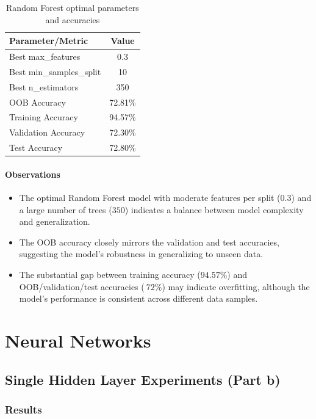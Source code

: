 \documentclass[12pt]{article}
\begin{document}
\begin{table}[h!]
\centering
\begin{tabular}{|l|c|}
\hline
\textbf{Parameter/Metric} & \textbf{Value} \\
\hline
Best max\_features & 0.3 \\
Best min\_samples\_split & 10 \\
Best n\_estimators & 350 \\
OOB Accuracy & 72.81\% \\
Training Accuracy & 94.57\% \\
Validation Accuracy & 72.30\% \\
Test Accuracy & 72.80\% \\
\hline
\end{tabular}
\caption{Random Forest optimal parameters and accuracies}
\label{tab:rf_results}
\end{table}

\paragraph{Observations}
\begin{itemize}
  \item The optimal Random Forest model with moderate features per split (\(0.3\)) and a large number of trees (\(350\)) indicates a balance between model complexity and generalization.
  \item The OOB accuracy closely mirrors the validation and test accuracies, suggesting the model's robustness in generalizing to unseen data.
  \item The substantial gap between training accuracy (\(94.57\%\)) and OOB/validation/test accuracies (\(~72\%\)) may indicate overfitting, although the model's performance is consistent across different data samples.
\end{itemize}


\section{Neural Networks}

\subsection{Single Hidden Layer Experiments (Part b)}

\subsubsection{Results}
\end{document}
